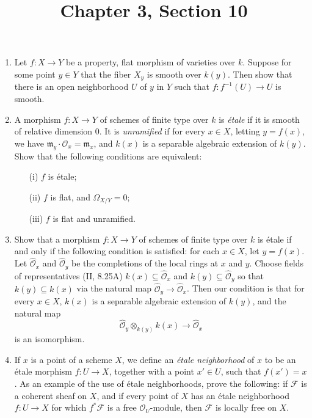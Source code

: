 \documentclass{article}
\title{Chapter 3, Section 10}
\newcommand{\goth}[1]{\mathfrak{#1}}
\newcommand{\fF}{\mathscr{F}}
\newcommand{\fO}{\mathscr{O}}
\begin{document}
\maketitle
\begin{enumerate} [label=\textbf{\arabic*.}, leftmargin=0em]


\item Let $f : X \to Y$ be a property, flat morphism of varieties over $k$. Suppose for some point $y \in Y$ that the fiber $X_y$ is smooth over $k(y)$. Then show that there is an open neighborhood $U$ of $y$ in $Y$ such that $f : f^{-1}(U) \to U$ is smooth.

\item A morphism $f : X \to Y$ of schemes of finite type over $k$ is \textit{étale} if it is smooth of relative dimension $0$. It is \textit{unramified} if for every $x \in X$, letting $y = f(x)$, we have $\goth{m}_y \cdot \fO_x = \goth{m}_x$, and $k(x)$ is a separable algebraic extension of $k(y)$. Show that the following conditions are equivalent:
\begin{itemize}
  \item[(i)] $f$ is étale;
  \item[(ii)] $f$ is flat, and $\Omega_{X/Y} = 0$;
  \item[(iii)] $f$ is flat and unramified.
\end{itemize}

\item Show that a morphism $f : X \to Y$ of schemes of finite type over $k$ is étale if and only if the following condition is satisfied: for each $x \in X$, let $y = f(x)$. Let $\hat{\fO}_x$ and $\hat{\fO}_y$ be the completions of the local rings at $x$ and $y$. Choose fields of representatives (II, 8.25A) $k(x) \subseteq \hat{\fO}_x$ and $k(y) \subseteq \hat{\fO}_y$ so that $k(y) \subseteq k(x)$ via the natural map $\hat{\fO}_y \to \hat{\fO}_x$. Then our condition is that for every $x \in X$, $k(x)$ is a separable algebraic extension of $k(y)$, and the natural map
\begin{equation*}
  \hat{\fO}_y \otimes_{k(y)} k(x) \to \hat{\fO}_x
\end{equation*}
is an isomorphism.

\item If $x$ is a point of a scheme $X$, we define an \textit{étale neighborhood} of $x$ to be an étale morphism $f : U \to X$, together with a point $x' \in U$, such that $f(x') = x$. As an example of the use of étale neighborhoods, prove the following: if $\fF$ is a coherent sheaf on $X$, and if every point of $X$ has an étale neighborhood $f : U \to X$ for which $f^*\fF$ is a free $\fO_U$-module, then $\fF$ is locally free on $X$.


\end{enumerate}
\end{document}
